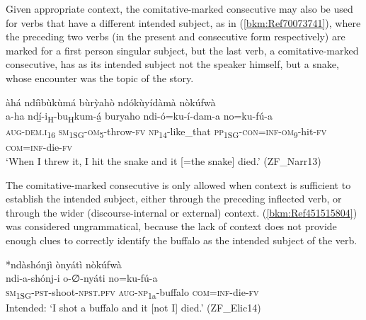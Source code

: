 Given appropriate context, the comitative-marked consecutive may also be used for verbs that have a different intended subject, as in (\ref{bkm:Ref70073741}), where the preceding two verbs (in the present and consecutive form respectively) are marked for a first person singular subject, but the last verb, a comitative-marked consecutive, has as its intended subject not the speaker himself, but a snake, whose encounter was the topic of the story.

\ea
\label{bkm:Ref70073741}
àhá ndíìbùkùmá bùrỳahò ndókùyídàmà nòkúfwà\\
\gll a-ha    ndí̲-i\textsubscript{H}-bu\textsubscript{H}kum-á̲    buryaho ndi-ó=ku-í-dam-a      no=ku-fú-a\\
\textsc{aug}-\textsc{dem}.\textsc{i}\textsubscript{16}  \textsc{sm}\textsubscript{1SG}-\textsc{om}\textsubscript{5}-throw-\textsc{fv}  \textsc{np}\textsubscript{14}-like\_that
\textsc{pp}\textsubscript{1SG}-\textsc{con}=\textsc{inf}-\textsc{om}\textsubscript{9}-hit-\textsc{fv}  \textsc{com}=\textsc{inf}-die-\textsc{fv}\\
\glt ‘When I threw it, I hit the snake and it [=the snake] died.’ (ZF\_Narr13)
\z

The comitative-marked consecutive is only allowed when context is sufficient to establish the intended subject, either through the preceding inflected verb, or through the wider (discourse-internal or external) context. (\ref{bkm:Ref451515804}) was considered ungrammatical, because the lack of context does not provide enough clues to correctly identify the buffalo as the intended subject of the verb.

\ea
\label{bkm:Ref451515804}
*ndàshónjì ònyátì nòkúfwà\\
\gll ndi-a-shónj-i    o-∅-nyáti    no=ku-fú-a\\
\textsc{sm}\textsubscript{1SG}-\textsc{pst}-shoot-\textsc{npst}.\textsc{pfv}  \textsc{aug}-\textsc{np}\textsubscript{1a}-buffalo  \textsc{com}=\textsc{inf}-die-\textsc{fv}\\
\glt Intended: ‘I shot a buffalo and it [not I] died.’ (ZF\_Elic14)
\z

